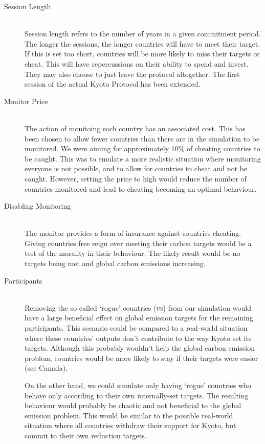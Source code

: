 \begin{description}
\item[Session Length] \hfill \\

Session length refers to the number of years in a given commitment period. The longer the sessions, the longer countries will have to meet their target. If this is set too short, countries will be more likely to miss their targets or cheat. This will have repercussions on their ability to spend and invest. They may also choose to just leave the protocol altogether.  The first session of the actual Kyoto Protocol has been extended.

\item[Monitor Price] \hfill \\

The action of monitoing each country has an associated cost. This has been chosen to allow fewer countries than there are in the simulation to be monitored. We were aiming for approximately 10\% of cheating countries to be caught. This was to emulate a more realistic situation where monitoring everyone is not possible, and to allow for countries to cheat and not be caught. However, setting the price to high would reduce the number of countries monitored and lead to cheating becoming an optimal behaviour.

\item[Disabling Monitoring] \hfill \\

The monitor provides a form of insurance against countries cheating. Giving countries free reign over meeting their carbon targets would be a test of the morality in their behaviour. The likely result would be no targets being met and global carbon emissions increasing.

\item[Participants] \hfill \\

Removing the so called `rogue' countries (\textsc{us}) from our simulation would have a large beneficial effect on global emission targets for the remaining participants. This scenario could be compared to a real-world situation where these countries' outputs don't contribute to the way Kyoto set its targets. Although this probably wouldn't help the global carbon emission problem, countries would be more likely to stay if their targets were easier (see Canada).

On the other hand, we could simulate only having `rogue' countries who behave only according to their own internally-set targets. The resulting behaviour would probably be chaotic and not beneficial to the global emission problem. This would be similar to the possible real-world situation where all countries withdraw their support for Kyoto, but commit to their own reduction targets.


\end{description}
